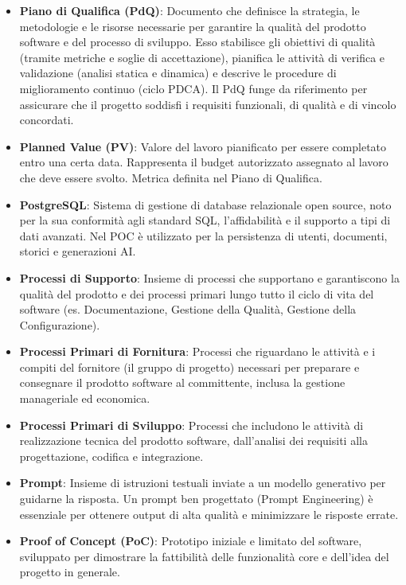 \documentclass[11pt,a4paper]{article}
\begin{document}
\begin{itemize}
\item \textbf{Piano di Qualifica (PdQ)}: Documento che definisce la strategia, le metodologie e le risorse necessarie per garantire la qualità del prodotto software e del processo di sviluppo. Esso stabilisce gli obiettivi di qualità (tramite metriche e soglie di accettazione), pianifica le attività di verifica e validazione (analisi statica e dinamica) e descrive le procedure di miglioramento continuo (ciclo PDCA). Il PdQ funge da riferimento per assicurare che il progetto soddisfi i requisiti funzionali, di qualità e di vincolo concordati.

\item \textbf{Planned Value (PV)}: Valore del lavoro pianificato per essere completato entro una certa data. Rappresenta il budget autorizzato assegnato al lavoro che deve essere svolto. Metrica definita nel Piano di Qualifica.

\item \textbf{PostgreSQL}: Sistema di gestione di database relazionale 
open source, noto per la sua conformità agli standard SQL, 
l'affidabilità e il supporto a tipi di dati avanzati. Nel POC è utilizzato per la persistenza di utenti, documenti, storici e generazioni AI.

\item \textbf{Processi di Supporto}: Insieme di processi che supportano e garantiscono la qualità del prodotto e dei processi primari lungo tutto il ciclo di vita del software (es. Documentazione, Gestione della Qualità, Gestione della Configurazione).

\item \textbf{Processi Primari di Fornitura}: Processi che riguardano le attività e i compiti del fornitore (il gruppo di progetto) necessari per preparare e consegnare il prodotto software al committente, inclusa la gestione manageriale ed economica.

\item \textbf{Processi Primari di Sviluppo}: Processi che includono le attività di realizzazione tecnica del prodotto software, dall'analisi dei requisiti alla progettazione, codifica e integrazione.

\item \textbf{Prompt}: Insieme di istruzioni testuali inviate a un modello generativo per guidarne la risposta. Un prompt ben progettato (Prompt Engineering) è essenziale per ottenere output di alta qualità e minimizzare le risposte errate.

\item \textbf{Proof of Concept (PoC)}: Prototipo iniziale e limitato del software, sviluppato per dimostrare la fattibilità delle funzionalità core e dell'idea del progetto in generale.


\end{itemize}
\end{document}
